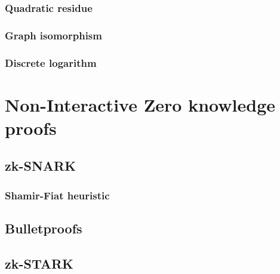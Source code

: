 \documentclass[12pt,a4paper]{article}
\begin{document}
\subsubsection{Quadratic residue}
\subsubsection{Graph isomorphism}
\subsubsection{Discrete logarithm}
\section{Non-Interactive Zero knowledge proofs}
\subsection{zk-SNARK} 
\subsubsection{Shamir-Fiat heuristic}
\subsection{Bulletproofs}
\subsection{zk-STARK}

\printbibliography
\end{document}
